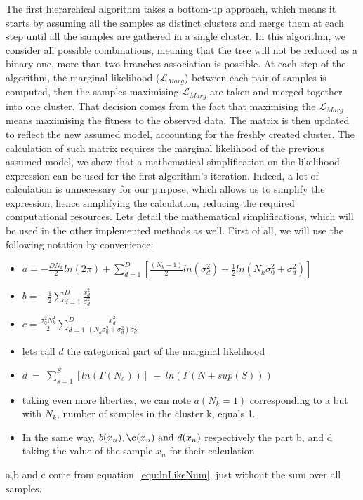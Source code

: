 \documentclass[twocolumn,12pt]{article}
\begin{document}
The first hierarchical algorithm takes a bottom-up approach, which means it starts by assuming all the samples as distinct clusters and merge them at each step until all the samples are gathered in a single cluster.
In this algorithm, we consider all possible combinations, meaning that the tree will not be reduced as a binary one, more than two branches association is possible.
At each step of the algorithm, the marginal likelihood ($\mathcal{L}_{Marg}$) between each pair of samples is computed, then the samples maximising $\mathcal{L}_{Marg}$ are taken and merged together into one cluster. That decision comes from the fact that maximising the $\mathcal{L}_{Marg}$ means maximising the fitness to the observed data.
The matrix is then updated to reflect the new assumed model, accounting for the freshly created cluster.
The calculation of such matrix requires the marginal likelihood of the previous assumed model, we show that a mathematical simplification on the likelihood expression can be used for the first algorithm's iteration.
Indeed, a lot of calculation is unnecessary for our purpose, which allows us to simplify the expression, hence simplifying the calculation, reducing the required computational resources.
Lets detail the mathematical simplifications, which will be used in the other implemented methods as well.
First of all, we will use the following notation by convenience:
\begin{itemize}
    \item $a=-\frac{DN_k}{2}ln(2\pi)+\sum_{d=1}^D[\frac{(N_k-1)}{2}ln(\sigma_d^2)+\frac{1}{2}ln(N_k\sigma_0^2+\sigma_d^2)]$
    \item $b=-\frac{1}{2}\sum_{d=1}^D\frac{x_{d}^2}{\sigma_d^2}$
    \item $c=\frac{\sigma_0^2N_k^2}{2}\sum_{d=1}^D\frac{\overline{x}_d^2}{(N_k\sigma_0^2+\sigma_d^2)\sigma_d^2}$
    \item lets call $d$ the categorical part of the marginal likelihood
    \item $d\ =\ \sum_{s=1}^S[ln(\Gamma(N_s))]\ -\ ln(\Gamma(N+sup(S)))$
    \item taking even more liberties, we can note $a(N_k=1)$ corresponding to a but with $N_k$, number of samples in the cluster k, equals 1.
    \item In the same way, $b(x_n),\c(x_n)\ \text{and}\ d(x_n)$ respectively the part b, and d taking the value of the sample $x_n$ for their calculation.
\end{itemize}
a,b and c come from equation~\ref{equ:lnLikeNum}, just without the sum over all samples.
\end{document}
